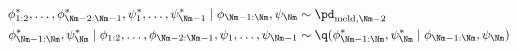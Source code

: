 \begin{align}
  \phi_{1:2}^{*}, \ldots, \phi_{\Nm - 2:\Nm - 1}^{*}, \psi_{1}^{*}, \ldots, \psi_{\Nm - 1}^{*} \mid \phi_{\Nm - 1:\Nm}, \psi_{\Nm} 
    &\sim 
    \pd_{\text{meld}, \Nm - 2}
  \\
  \phi_{\Nm - 1:\Nm}^{*}, \psi_{\Nm}^{*} \mid \phi_{1:2}, \ldots, \phi_{\Nm - 2:\Nm - 1}, \psi_{1}, \ldots, \psi_{\Nm - 1} 
    &\sim
    \q(\phi_{\Nm - 1:\Nm}^{*}, \psi_{\Nm}^{*} \mid \phi_{\Nm - 1:\Nm}, \psi_{\Nm})
  \label{eqn:stage-Mminus1-gibbs-updates}
\end{align}